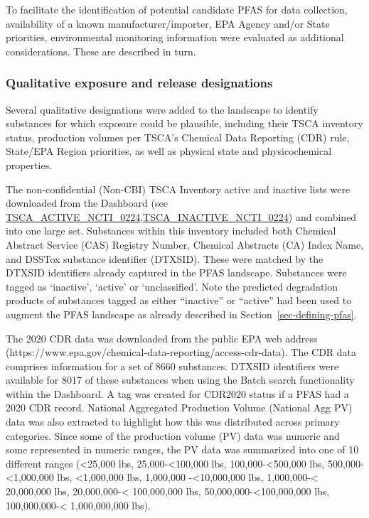 \documentclass[
  super,
  preprint,
  3p]{elsarticle}
\begin{document}
To facilitate the identification of potential candidate PFAS for data
collection, availability of a known manufacturer/importer, EPA Agency
and/or State priorities, environmental monitoring information were
evaluated as additional considerations. These are described in turn.

\hypertarget{sec-lists}{%
\subsubsection{Qualitative exposure and release
designations}\label{sec-lists}}

Several qualitative designations were added to the landscape to identify
substances for which exposure could be plausible, including their TSCA
inventory status, production volumes per TSCA's Chemical Data Reporting
(CDR) rule, State/EPA Region priorities, as well as physical state and
physicochemical properties.

The non-confidential (Non-CBI) TSCA Inventory active and inactive lists
were downloaded from the Dashboard (see
\href{https://comptox.epa.gov/dashboard/chemical-lists/TSCA_ACTIVE_NCTI_0224}{TSCA\_ACTIVE\_NCTI\_0224},\href{https://comptox.epa.gov/dashboard/chemical-lists/TSCA_INACTIVE_NCTI_0224}{TSCA\_INACTIVE\_NCTI\_0224})
and combined into one large set. Substances within this inventory
included both Chemical Abstract Service (CAS) Registry Number, Chemical
Abstracts (CA) Index Name, and DSSTox substance identifier (DTXSID).
These were matched by the DTXSID identifiers already captured in the
PFAS landscape. Substances were tagged as `inactive', `active' or
`unclassified'. Note the predicted degradation products of substances
tagged as either ``inactive'' or ``active'' had been used to augment the
PFAS landscape as already described in Section~\ref{sec-defining-pfas}.

The 2020 CDR data was downloaded from the public EPA web address
(https://www.epa.gov/chemical-data-reporting/access-cdr-data). The CDR
data comprises information for a set of 8660 substances. DTXSID
identifiers were available for 8017 of these substances when using the
Batch search functionality within the Dashboard. A tag was created for
CDR2020 status if a PFAS had a 2020 CDR record. National Aggregated
Production Volume (National Agg PV) data was also extracted to highlight
how this was distributed across primary categories. Since some of the
production volume (PV) data was numeric and some represented in numeric
ranges, the PV data was summarized into one of 10 different ranges
(\textless25,000 lbs, 25,000-\textless100,000 lbs,
100,000-\textless500,000 lbs, 500,000-\textless1,000,000 lbs,
\textless1,000,000 lbs, 1,000,000 -\textless10,000,000 lbs,
1,000,000-\textless{} 20,000,000 lbs, 20,000,000-\textless{} 100,000,000
lbs, 50,000,000-\textless100,000,000 lbs, 100,000,000-\textless{}
1,000,000,000 lbs).\\
\end{document}

